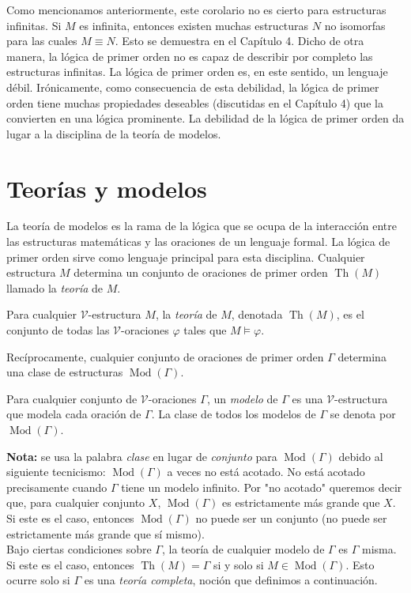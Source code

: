 \documentclass[12pt,a4paper]{book}
\newcommand{\comillas}[1]{"#1"}
\newcommand{\VV}{\mathcal{V}}
\DeclareMathOperator{\Th}{Th}
\DeclareMathOperator{\Mod}{Mod}
\begin{document}
    Como mencionamos anteriormente, este corolario no es cierto para estructuras infinitas. Si $M$ es infinita, entonces
    existen muchas estructuras $N$ no isomorfas para las cuales $M\equiv N$. Esto se demuestra en el Capítulo 4. Dicho de
    otra manera, la lógica de primer orden no es capaz de describir por completo las estructuras infinitas. La lógica de
    primer orden es, en este sentido, un lenguaje débil. Irónicamente, como consecuencia de esta debilidad, la lógica de
    primer orden tiene muchas propiedades deseables (discutidas en el Capítulo 4) que la convierten en una lógica
    prominente. La debilidad de la lógica de primer orden da lugar a la disciplina de la teoría de modelos.

    \section{Teorías y modelos}

    La teoría de modelos es la rama de la lógica que se ocupa de la interacción entre las estructuras matemáticas y las
    oraciones de un lenguaje formal. La lógica de primer orden sirve como lenguaje principal para esta disciplina.
    Cualquier estructura $M$ determina un conjunto de oraciones de primer orden $\Th(M)$ llamado la \textit{teoría} de
    $M$.

    \begin{definicion}\label{def:teoria-de-M}
        Para cualquier $\VV$-estructura $M$, la \textit{teoría} de $M$, denotada $\Th(M)$, es el conjunto de todas las
        $\VV$-oraciones $\varphi$ tales que $M\models\varphi$.
    \end{definicion}

    Recíprocamente, cualquier conjunto de oraciones de primer orden $\Gamma$ determina una clase de estructuras
    $\Mod(\Gamma)$.

    \begin{definicion}[Modelo]\label{def:modelo-clase}
        Para cualquier conjunto de $\VV$-oraciones $\Gamma$, un \textit{modelo} de $\Gamma$ es una $\VV$-estructura que
        modela cada oración de $\Gamma$. La clase de todos los modelos de $\Gamma$ se denota por $\Mod(\Gamma)$.
    \end{definicion}

    \textbf{Nota:} se usa la palabra \textit{clase} en lugar de \textit{conjunto} para $\Mod(\Gamma)$ debido al siguiente
    tecnicismo: $\Mod(\Gamma)$ a veces no está acotado. No está acotado precisamente cuando $\Gamma$ tiene un modelo
    infinito. Por \comillas{no acotado} queremos decir que, para cualquier conjunto $X$, $\Mod(\Gamma)$ es estrictamente
    más grande que $X$. Si este es el caso, entonces $\Mod(\Gamma)$ no puede ser un conjunto (no puede ser estrictamente
    más grande que sí mismo).\\
    Bajo ciertas condiciones sobre $\Gamma$, la teoría de cualquier modelo de $\Gamma$ es $\Gamma$ misma. Si este es el
    caso, entonces $\Th(M)=\Gamma$ si y solo si $M\in\Mod(\Gamma)$. Esto ocurre solo si $\Gamma$ es una \textit{teoría
    completa}, noción que definimos a continuación.
\end{document}

